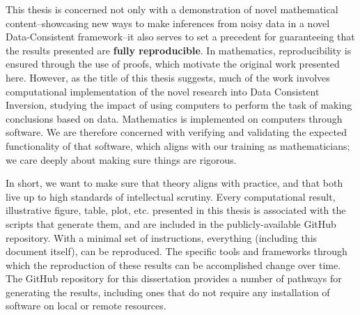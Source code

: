 This thesis is concerned not only with a demonstration of novel mathematical content\---showcasing new ways to make inferences from noisy data in a novel Data-Consistent framework\---it also serves to set a precedent for guaranteeing that the results presented are \textbf{fully reproducible}.
In mathematics, reproducibility is ensured through the use of proofs, which motivate the original work presented here.
However, as the title of this thesis suggests, much of the work involves computational implementation of the novel research into Data Consistent Inversion, studying the impact of using computers to perform the task of making conclusions based on data.
Mathematics is implemented on computers through software.
We are therefore concerned with verifying and validating the expected functionality of that software, which aligns with our training as mathematicians; we care deeply about making sure things are rigorous.

In short, we want to make sure that theory aligns with practice, and that both live up to high standards of intellectual scrutiny.
Every computational result, illustrative figure, table, plot, etc. presented in this thesis is associated with the scripts that generate them, and are included in the publicly-available GitHub repository.
With a minimal set of instructions, everything (including this document itself), can be reproduced.
The specific tools and frameworks through which the reproduction of these results can be accomplished change over time.
The GitHub repository \citep{github} for this dissertation provides a number of pathways for generating the results, including ones that do not require any installation of software on local or remote resources.

\FloatBarrier
